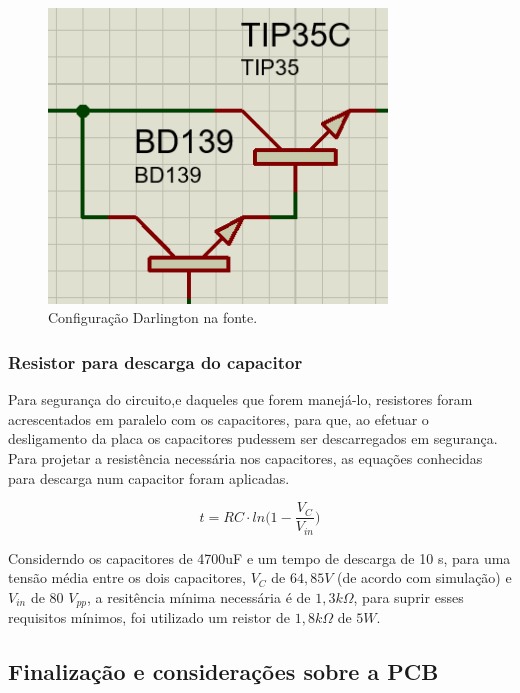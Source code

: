 \documentclass[a4paper,12pt,oneside,openany,table,xcdraw]{article}
\begin{document}
\vspace{0.2cm}
\begin{figure}[H]
\centering
\includegraphics[width=9cm]{fonte-darlington}
\caption{Configuração Darlington na fonte.}
\label{fonte:darlington}
\end{figure}

\subsubsection{Resistor para descarga do capacitor} \label{descarga}
Para segurança do circuito,e daqueles que forem manejá-lo, resistores foram acrescentados em paralelo com os capacitores, para que, ao efetuar o desligamento da placa os capacitores pudessem ser descarregados em segurança.
Para projetar a resistência necessária nos capacitores, as equações conhecidas para descarga num capacitor foram aplicadas.

\begin{equation}
t= RC \cdot ln\bigg( 1 - \frac{V_{C}}{V_{in}} \bigg) 
\end{equation}

Considerndo os capacitores de 4700uF e um tempo de descarga de 10 s, para uma tensão média entre os dois capacitores, $V_{C}$ de $64,85 V$ (de acordo com simulação) e $V_{in}$ de 80 $V_{pp}$, a resitência mínima necessária é de $1,3 k\Omega$, para suprir esses requisitos mínimos, foi utilizado um reistor de $1,8 k\Omega$ de $5W$. 



\vspace{0.3cm}
\subsection{Finalização e considerações sobre a PCB}
\end{document}
